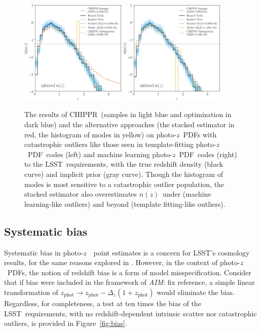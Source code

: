 \documentclass[iop]{emulateapj}
\newcommand{\todo}[3]{{\color{#2}\emph{#1}: #3}}
\newcommand{\aim}[1]{\todo{AIM}{red}{#1}}
\newcommand{\Fig}[1]{Figure~\ref{#1}}
\newcommand{\project}[1]{{\textsc{#1}}}
\newcommand{\lsst}{\project{LSST}}
\newcommand{\Chippr}{\project{CHIPPR}}
\newcommand{\nz}{$n(z)$}
\newcommand{\pz}{photo-$z$~}
\newcommand{\pzpdf}{\pz PDF}
\begin{document}
\begin{figure}
	\begin{center}
	\includegraphics[width=0.45\textwidth]{figures/chippr/thesis_eout_log_estimators.png}
	\includegraphics[width=0.45\textwidth]{figures/chippr/thesis_rout_log_estimators.png}
	\caption{
		The results of \Chippr\ (samples in light blue and optimization in dark blue) and the alternative approaches (the stacked estimator in red, the histogram of modes in yellow) on \pzpdf s with catastrophic outliers like those seen in template-fitting \pzpdf\ codes (left) and machine learning \pzpdf\ codes (right) to the \lsst\ requirements, with the true redshift density (black curve) and implicit prior (gray curve).
		Though the histogram of modes is most sensitive to a catastrophic outlier population, the stacked estimator also overestimates \nz\ under (machine learning-like outliers) and beyond (template fitting-like outliers).
	}
	\label{fig:nonuniform-outliers-results}
	\end{center}
\end{figure}

\subsection{Systematic bias}
\label{sec:bias}

Systematic bias in \pz\ point estimates is a concern for \lsst's cosmology results, for the same reasons explored in \citet{hoyle_dark_2017}.
However, in the context of \pzpdf s, the notion of redshift bias is a form of model misspecification.
Consider that if bias were included in the framework of \aim{fix reference},
a simple linear transformation of $z_{\mathrm{phot}} \to z_{\mathrm{phot}} - \Delta_{z} (1 + z_{\mathrm{phot}})$ would eliminate the bias.
Regardless, for completeness, a test at ten times the bias of the \lsst\ requirements, with no redshift-dependent intrinsic scatter nor catastrophic outliers, is provided in \Fig{fig:bias}.
\end{document}
